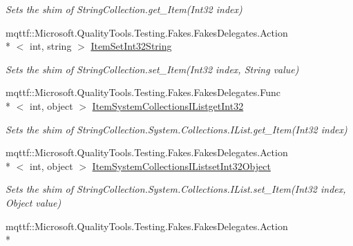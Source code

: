 \begin{DoxyCompactItemize}
\begin{DoxyCompactList}\small\item\em Sets the shim of String\-Collection.\-get\-\_\-\-Item(\-Int32 index)\end{DoxyCompactList}\item 
mqttf\-::\-Microsoft.\-Quality\-Tools.\-Testing.\-Fakes.\-Fakes\-Delegates.\-Action\\*
$<$ int, string $>$ \hyperlink{class_system_1_1_collections_1_1_specialized_1_1_fakes_1_1_shim_string_collection_a9482c7b44d42765ad584cbf60303202e}{Item\-Set\-Int32\-String}
\begin{DoxyCompactList}\small\item\em Sets the shim of String\-Collection.\-set\-\_\-\-Item(\-Int32 index, String value)\end{DoxyCompactList}\item 
mqttf\-::\-Microsoft.\-Quality\-Tools.\-Testing.\-Fakes.\-Fakes\-Delegates.\-Func\\*
$<$ int, object $>$ \hyperlink{class_system_1_1_collections_1_1_specialized_1_1_fakes_1_1_shim_string_collection_a56d689e5d3aa24262be698d5d43c513a}{Item\-System\-Collections\-I\-Listget\-Int32}
\begin{DoxyCompactList}\small\item\em Sets the shim of String\-Collection.\-System.\-Collections.\-I\-List.\-get\-\_\-\-Item(\-Int32 index)\end{DoxyCompactList}\item 
mqttf\-::\-Microsoft.\-Quality\-Tools.\-Testing.\-Fakes.\-Fakes\-Delegates.\-Action\\*
$<$ int, object $>$ \hyperlink{class_system_1_1_collections_1_1_specialized_1_1_fakes_1_1_shim_string_collection_ab4ba17557aec43a0c57924c5ecd612b0}{Item\-System\-Collections\-I\-Listset\-Int32\-Object}
\begin{DoxyCompactList}\small\item\em Sets the shim of String\-Collection.\-System.\-Collections.\-I\-List.\-set\-\_\-\-Item(\-Int32 index, Object value)\end{DoxyCompactList}\item 
mqttf\-::\-Microsoft.\-Quality\-Tools.\-Testing.\-Fakes.\-Fakes\-Delegates.\-Action\\*

\end{DoxyCompactItemize}

